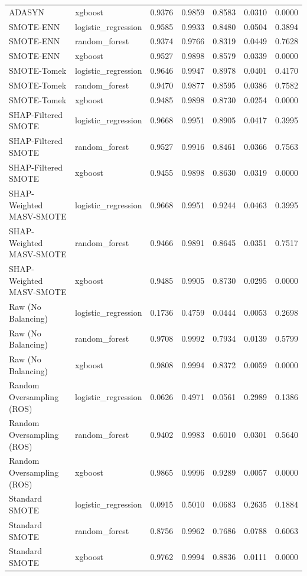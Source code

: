 \begin{table}[htbp]
\begin{tabular}{lllllll}
ADASYN & xgboost & 0.9376 & 0.9859 & 0.8583 & 0.0310 & 0.0000 \\
SMOTE-ENN & logistic_regression & 0.9585 & 0.9933 & 0.8480 & 0.0504 & 0.3894 \\
SMOTE-ENN & random_forest & 0.9374 & 0.9766 & 0.8319 & 0.0449 & 0.7628 \\
SMOTE-ENN & xgboost & 0.9527 & 0.9898 & 0.8579 & 0.0339 & 0.0000 \\
SMOTE-Tomek & logistic_regression & 0.9646 & 0.9947 & 0.8978 & 0.0401 & 0.4170 \\
SMOTE-Tomek & random_forest & 0.9470 & 0.9877 & 0.8595 & 0.0386 & 0.7582 \\
SMOTE-Tomek & xgboost & 0.9485 & 0.9898 & 0.8730 & 0.0254 & 0.0000 \\
SHAP-Filtered SMOTE & logistic_regression & 0.9668 & 0.9951 & 0.8905 & 0.0417 & 0.3995 \\
SHAP-Filtered SMOTE & random_forest & 0.9527 & 0.9916 & 0.8461 & 0.0366 & 0.7563 \\
SHAP-Filtered SMOTE & xgboost & 0.9455 & 0.9898 & 0.8630 & 0.0319 & 0.0000 \\
SHAP-Weighted MASV-SMOTE & logistic_regression & 0.9668 & 0.9951 & 0.9244 & 0.0463 & 0.3995 \\
SHAP-Weighted MASV-SMOTE & random_forest & 0.9466 & 0.9891 & 0.8645 & 0.0351 & 0.7517 \\
SHAP-Weighted MASV-SMOTE & xgboost & 0.9485 & 0.9905 & 0.8730 & 0.0295 & 0.0000 \\
Raw (No Balancing) & logistic_regression & 0.1736 & 0.4759 & 0.0444 & 0.0053 & 0.2698 \\
Raw (No Balancing) & random_forest & 0.9708 & 0.9992 & 0.7934 & 0.0139 & 0.5799 \\
Raw (No Balancing) & xgboost & 0.9808 & 0.9994 & 0.8372 & 0.0059 & 0.0000 \\
Random Oversampling (ROS) & logistic_regression & 0.0626 & 0.4971 & 0.0561 & 0.2989 & 0.1386 \\
Random Oversampling (ROS) & random_forest & 0.9402 & 0.9983 & 0.6010 & 0.0301 & 0.5640 \\
Random Oversampling (ROS) & xgboost & 0.9865 & 0.9996 & 0.9289 & 0.0057 & 0.0000 \\
Standard SMOTE & logistic_regression & 0.0915 & 0.5010 & 0.0683 & 0.2635 & 0.1884 \\
Standard SMOTE & random_forest & 0.8756 & 0.9962 & 0.7686 & 0.0788 & 0.6063 \\
Standard SMOTE & xgboost & 0.9762 & 0.9994 & 0.8836 & 0.0111 & 0.0000 \\

\end{tabular}
\end{table}
